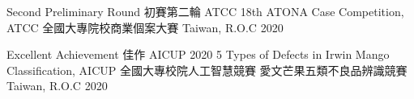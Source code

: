 



\begin{cvhonors}

  \cvhonor
    {Second Preliminary Round 初賽第二輪} %
    {ATCC 18th ATONA Case Competition, ATCC 全國大專院校商業個案大賽} %
    {Taiwan, R.O.C} %
    {2020} %

  \cvhonor
    {Excellent Achievement 佳作} %
    {AICUP 2020 5 Types of Defects in Irwin Mango Classification, AICUP 全國大專校院人工智慧競賽 愛文芒果五類不良品辨識競賽} %
    {Taiwan, R.O.C} %
    {2020} %
\end{cvhonors}

